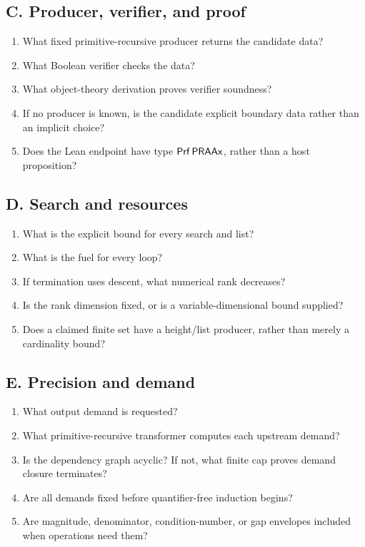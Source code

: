 \subsection*{C. Producer, verifier, and proof}
\begin{enumerate}
  \item What fixed primitive-recursive producer returns the candidate data?
  \item What Boolean verifier checks the data?
  \item What object-theory derivation proves verifier soundness?
  \item If no producer is known, is the candidate explicit boundary data rather than an implicit choice?
  \item Does the Lean endpoint have type \(\mathsf{Prf}\,\mathsf{PRAAx}\), rather than a host proposition?
\end{enumerate}

\subsection*{D. Search and resources}
\begin{enumerate}
  \item What is the explicit bound for every search and list?
  \item What is the fuel for every loop?
  \item If termination uses descent, what numerical rank decreases?
  \item Is the rank dimension fixed, or is a variable-dimensional bound supplied?
  \item Does a claimed finite set have a height/list producer, rather than merely a cardinality bound?
\end{enumerate}

\subsection*{E. Precision and demand}
\begin{enumerate}
  \item What output demand is requested?
  \item What primitive-recursive transformer computes each upstream demand?
  \item Is the dependency graph acyclic?  If not, what finite cap proves demand closure terminates?
  \item Are all demands fixed before quantifier-free induction begins?
  \item Are magnitude, denominator, condition-number, or gap envelopes included when operations need them?
\end{enumerate}

